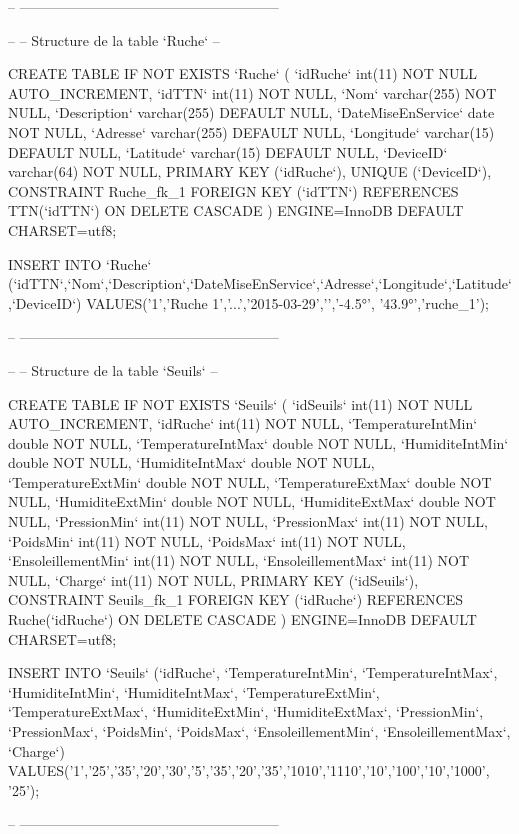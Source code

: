 \begin{DoxyCode}
-- --------------------------------------------------------

--
-- Structure de la table `Ruche`
--

CREATE TABLE IF NOT EXISTS `Ruche` (
  `idRuche` int(11) NOT NULL AUTO\_INCREMENT,
  `idTTN` int(11) NOT NULL,
  `Nom` varchar(255) NOT NULL,
  `Description` varchar(255) DEFAULT NULL,
  `DateMiseEnService` date NOT NULL,
  `Adresse` varchar(255) DEFAULT NULL,
  `Longitude` varchar(15) DEFAULT NULL,
  `Latitude` varchar(15) DEFAULT NULL,
  `DeviceID` varchar(64) NOT NULL,
  PRIMARY KEY (`idRuche`),
  UNIQUE (`DeviceID`),
  CONSTRAINT Ruche\_fk\_1 FOREIGN KEY (`idTTN`) REFERENCES TTN(`idTTN`) ON DELETE CASCADE
) ENGINE=InnoDB DEFAULT CHARSET=utf8;

INSERT INTO `Ruche`
       (`idTTN`,`Nom`,`Description`,`DateMiseEnService`,`Adresse`,`Longitude`,`Latitude`,`DeviceID`) VALUES('1','Ruche 1','...','2015-03-29','','-4.5°', '43.9°','ruche\_1');

-- --------------------------------------------------------

--
-- Structure de la table `Seuils`
--

CREATE TABLE IF NOT EXISTS `Seuils` (
  `idSeuils` int(11) NOT NULL AUTO\_INCREMENT,
  `idRuche` int(11) NOT NULL,
  `TemperatureIntMin` double NOT NULL,
  `TemperatureIntMax` double NOT NULL,
  `HumiditeIntMin` double NOT NULL,
  `HumiditeIntMax` double NOT NULL,
  `TemperatureExtMin` double NOT NULL,
  `TemperatureExtMax` double NOT NULL,
  `HumiditeExtMin` double NOT NULL,
  `HumiditeExtMax` double NOT NULL,
  `PressionMin` int(11) NOT NULL,
  `PressionMax` int(11) NOT NULL,
  `PoidsMin` int(11) NOT NULL,
  `PoidsMax` int(11) NOT NULL,
  `EnsoleillementMin` int(11) NOT NULL,
  `EnsoleillementMax` int(11) NOT NULL,
  `Charge` int(11) NOT NULL,
  PRIMARY KEY (`idSeuils`),
  CONSTRAINT Seuils\_fk\_1 FOREIGN KEY (`idRuche`) REFERENCES Ruche(`idRuche`) ON DELETE CASCADE
) ENGINE=InnoDB DEFAULT CHARSET=utf8;

INSERT INTO `Seuils` (`idRuche`, `TemperatureIntMin`, `TemperatureIntMax`, `HumiditeIntMin`,
       `HumiditeIntMax`, `TemperatureExtMin`, `TemperatureExtMax`, `HumiditeExtMin`, `HumiditeExtMax`, `PressionMin`,
       `PressionMax`, `PoidsMin`, `PoidsMax`, `EnsoleillementMin`, `EnsoleillementMax`, `Charge`)
       VALUES('1','25','35','20','30','5','35','20','35','1010','1110','10','100','10','1000', '25');

-- --------------------------------------------------------


\end{DoxyCode}

